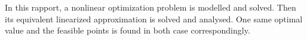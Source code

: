In this rapport, a nonlinear optimization problem is modelled and solved. Then its equivalent linearized approximation is solved and analysed. One same optimal value and the feasible points is found in both case correspondingly. 
